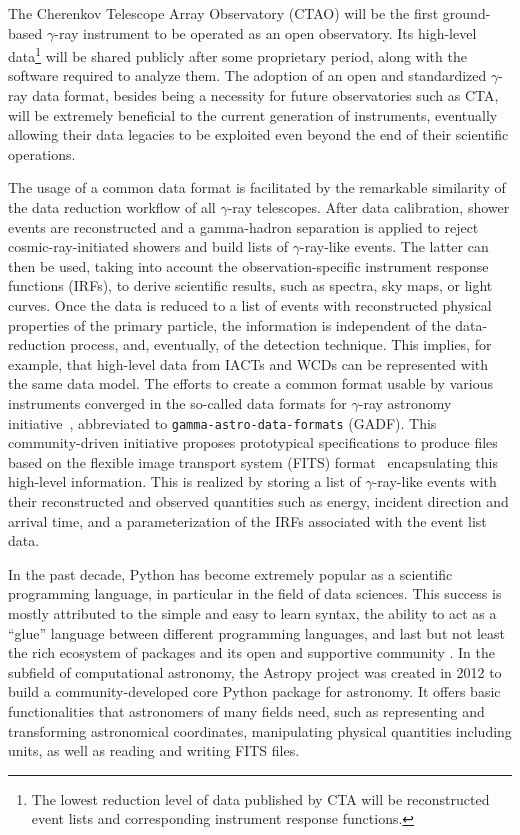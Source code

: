 \documentclass[longauth]{aa}
\newcommand{\astropy}{Astropy\xspace}
\newcommand{\cta}{CTA\xspace}
\newcommand{\gammaray}{$\gamma$-ray\xspace}
\newcommand{\gadf}{GADF\xspace}
\begin{document}
The Cherenkov Telescope Array Observatory (CTAO) will be the first ground-based
\gammaray instrument to be operated as an open observatory.
Its high-level data\footnote{The lowest reduction level of data published by \cta will be reconstructed event lists and corresponding instrument response functions.}
will be shared publicly after some proprietary period, along with the software required to analyze them.
The adoption of an open and standardized \gammaray data format, besides being a necessity for future observatories such as \cta,
will be extremely beneficial to the current generation of instruments, eventually allowing their data legacies to be exploited even
beyond the end of their scientific operations.

The usage of a common data format is facilitated by the remarkable similarity of the data reduction workflow of all \gammaray telescopes.
After data calibration, shower events are reconstructed and
a gamma-hadron separation is applied to reject cosmic-ray-initiated showers and build lists of \gammaray-like events.
The latter can then be used, taking into account the observation-specific instrument response functions (IRFs),
to derive scientific results, such as spectra, sky maps, or light curves.
Once the data is reduced to a list of events with reconstructed physical properties of the primary particle,
the information is independent of the data-reduction process, and, eventually, of the detection technique. This implies,
for example, that high-level data from IACTs and WCDs can be represented
with the same data model.
The efforts to create a common format usable by various instruments
converged in the so-called {data formats for \gammaray astronomy}
initiative~\citep{gadf_proc,gadf_universe}, abbreviated to
\texttt{gamma-astro-data-formats} (\gadf). This community-driven initiative proposes prototypical
specifications to produce files based on the flexible image transport system
(FITS) format~\citep{fits} encapsulating this high-level information. This is
realized by storing a list of \gammaray-like events with their reconstructed and observed
quantities such as energy, incident direction and arrival time, and a parameterization of
the IRFs associated with the event list data. %

In the past decade, {Python} has become extremely popular as a scientific programming language,
in particular in the field of data sciences. This success is
mostly attributed to the simple and easy to learn syntax, the ability to act as
a \enquote{glue} language between different programming languages, and last but not least
the rich ecosystem of packages and its open and supportive community \citep{Momcheva2015}.
In the subfield of computational astronomy, the \astropy project \citep{astropy} was created in 2012
to build a community-developed core Python package for astronomy.
It offers basic functionalities that astronomers of many fields need, such as representing
and transforming astronomical coordinates, manipulating physical quantities including units,
as well as reading and writing FITS files.
\end{document}
